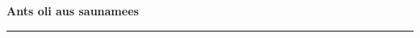 \documentclass[10pt]{book}
\begin{document}
{
  \samepage
  \raggedbottom
  \raggedright
  \sloppy


  \vspace{0.2in}

  \noindent\begin{minipage}{.1\textwidth}
    \hfill\vspace{0.1in}
  \end{minipage}%
  \noindent\begin{minipage}{.8\textwidth}
    \centering
    \bfseries
    \large Ants oli aus saunamees
  \end{minipage}%
  \noindent\begin{minipage}{.1\textwidth}
      \hfill\vspace{0.1in}
  \end{minipage}

  \nopagebreak[4]
  \vspace{0.1in}
  \nopagebreak[4]
  \hrule height 0.05ex
  \nopagebreak[4]
  \vspace{-0.05in}




}
\end{document}
